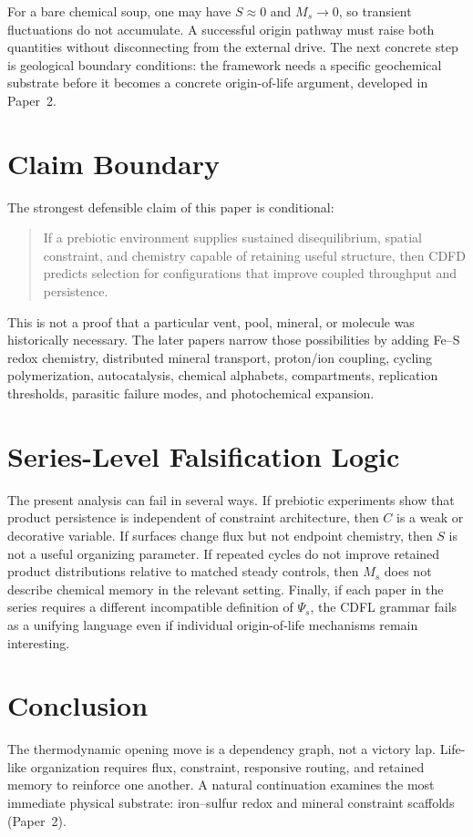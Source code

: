 \documentclass[11pt,a4paper]{article}
\begin{document}
For a bare chemical soup, one may have $S\approx 0$ and $M_s\to 0$, so transient fluctuations do not accumulate. A successful origin pathway must raise both quantities without disconnecting from the external drive. The next concrete step is geological boundary conditions: the framework needs a specific geochemical substrate before it becomes a concrete origin-of-life argument, developed in Paper~2.

\section{Claim Boundary}
The strongest defensible claim of this paper is conditional:
\begin{quote}
If a prebiotic environment supplies sustained disequilibrium, spatial constraint, and chemistry capable of retaining useful structure, then CDFD predicts selection for configurations that improve coupled throughput and persistence.
\end{quote}

This is not a proof that a particular vent, pool, mineral, or molecule was historically necessary. The later papers narrow those possibilities by adding Fe--S redox chemistry, distributed mineral transport, proton/ion coupling, cycling polymerization, autocatalysis, chemical alphabets, compartments, replication thresholds, parasitic failure modes, and photochemical expansion.

\section{Series-Level Falsification Logic}
The present analysis can fail in several ways. If prebiotic experiments show that
product persistence is independent of constraint architecture, then $C$ is a
weak or decorative variable. If surfaces change flux but not endpoint chemistry,
then $S$ is not a useful organizing parameter. If repeated cycles do not improve
retained product distributions relative to matched steady controls, then $M_s$
does not describe chemical memory in the relevant setting. Finally, if each
paper in the series requires a different incompatible definition of
$\Psi_s$, the CDFL grammar fails as a unifying language even if individual
origin-of-life mechanisms remain interesting.

\section{Conclusion}
The thermodynamic opening move is a dependency graph, not a victory lap. Life-like organization requires flux, constraint, responsive routing, and retained memory to reinforce one another. A natural continuation examines the most immediate physical substrate: iron--sulfur redox and mineral constraint scaffolds (Paper~2).
\end{document}
